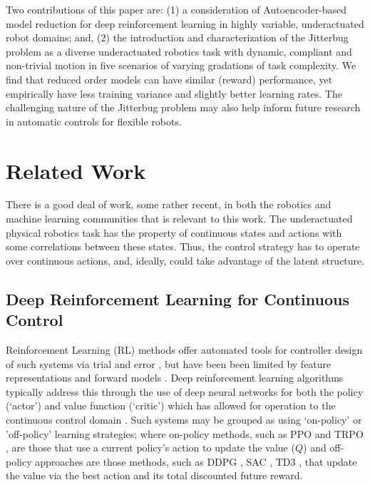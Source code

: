 \documentclass[letterpaper, 10 pt, conference]{ieeeconf}
\begin{document}
Two contributions of this paper are: (1) a consideration of Autoencoder-based model reduction for deep reinforcement learning in highly variable, underactuated robot domains; and, (2) the introduction and characterization of the Jitterbug problem as a diverse underactuated robotics task with dynamic, compliant and non-trivial motion in five scenarios of varying gradations of task complexity.
We find that reduced order models can have similar (reward) performance, yet empirically have less training variance and slightly better learning rates.  
The challenging nature of the Jitterbug problem may also help inform future research in automatic controls for flexible robots.

\section{Related Work}

There is a good deal of work, some rather recent, in both the robotics and machine learning communities that is relevant to this work.  The underactuated physical robotics task has the property of continuous states and actions with some correlations between these states.   Thus, the control strategy has to operate over continuous actions, and, ideally, could take advantage of the latent structure. 

\subsection{Deep Reinforcement Learning for Continuous Control}

Reinforcement Learning (RL) methods offer automated tools for controller design of such systems via trial and error \cite{sutton1998reinforcement}, but have been been limited by feature representations and forward models \cite{duan2016benchmarking}. 
Deep reinforcement learning algorithms typically address this through the use of deep neural networks for both the policy (`actor') and value function (`critic') which has allowed for operation to the continuous control domain \cite{DDPG,mnih2015human}. 
Such systems may be grouped as using `on-policy' or 'off-policy' learning strategies; where on-policy methods, such as PPO \cite{PPO} and TRPO \cite{TRPO}, are those that use a current policy's action to update the value ($Q$) and off-policy approaches are those methods, such as DDPG \cite{DDPG}, SAC \cite{SAC}, TD3 \cite{TD3}, that update the value via the best action and its total discounted future reward.  
\end{document}
